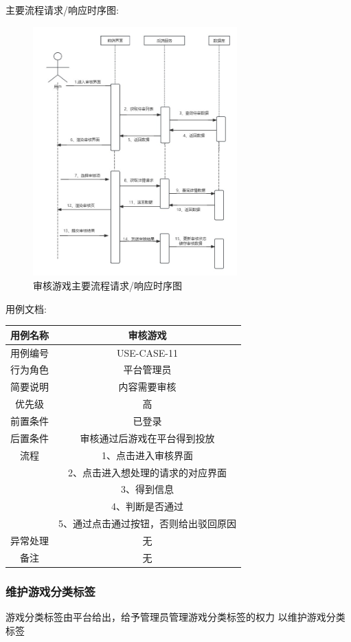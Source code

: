 \documentclass[12pt]{ctexart} %
\begin{document}
主要流程请求/响应时序图:
\begin{figure}[ht]
  \centering
  \includegraphics[width=0.7\textwidth]{yongli11.jpg}
  \caption{审核游戏主要流程请求/响应时序图}
\end{figure}
用例文档:

\begin{tabular}{|c|c|}
  \hline
  用例名称& 审核游戏\\
  \hline
  用例编号 & USE-CASE-11\\
  \hline
  行为角色 & 平台管理员\\
  \hline
  简要说明 & 内容需要审核\\
  \hline
  优先级 & 高\\
  \hline
  前置条件 & 已登录\\
  \hline
  后置条件 & 审核通过后游戏在平台得到投放\\
  \hline
  流程 & 1、点击进入审核界面\\
      &  2、点击进入想处理的请求的对应界面\\
      &  3、得到信息\\
      &  4、判断是否通过\\
      &  5、通过点击通过按钮，否则给出驳回原因\\
  \hline
  异常处理 & 无\\
  \hline
  备注 & 无\\
\end{tabular}

\subsubsection{维护游戏分类标签}
游戏分类标签由平台给出，给予管理员管理游戏分类标签的权力
以维护游戏分类标签
\end{document}
